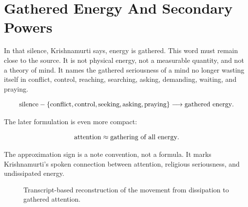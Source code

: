 \documentclass[11pt,oneside]{book}
\begin{document}
\section{Gathered Energy And Secondary Powers}

In that silence, Krishnamurti says, energy is gathered. This word must remain close to the source. It is not physical energy, not a measurable quantity, and not a theory of mind. It names the gathered seriousness of a mind no longer wasting itself in conflict, control, reaching, searching, asking, demanding, waiting, and praying.

\begin{equation}
\hbox{silence}
-
\{\hbox{conflict},\hbox{control},\hbox{seeking},\hbox{asking},\hbox{praying}\}
\longrightarrow
\hbox{gathered energy}.
\end{equation}

The later formulation is even more compact:

\begin{equation}
\hbox{attention}
\approx
\hbox{gathering of all energy}.
\end{equation}

The approximation sign is a note convention, not a formula. It marks Krishnamurti's spoken connection between attention, religious seriousness, and undissipated energy.

\begin{figure}
\centering
{}
\caption{Transcript-based reconstruction of the movement from dissipation to gathered attention.}
\end{figure}
\end{document}
